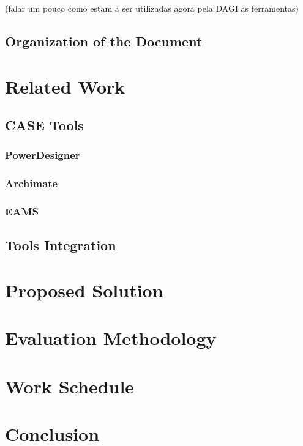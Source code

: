 \documentclass[runningheads]{llncs}
\begin{document}
(falar um pouco como estam a ser utilizadas agora pela DAGI as ferramentas)


\subsection{Organization of the Document} 

\section{Related Work}
\subsection{CASE Tools}
\subsubsection{PowerDesigner}
\subsubsection{Archimate}
\subsubsection{EAMS}
\subsection{Tools Integration}
\section{Proposed Solution}
\section{Evaluation Methodology}
\section{Work Schedule}

\section{Conclusion}
\end{document}
